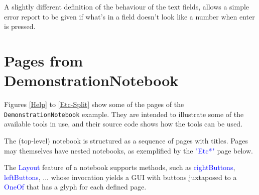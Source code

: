\documentclass[12pt,a4paper]{article}
\def\Scala#1{\textcolor{blue}{\textsf{#1}}}
\def\S#1{\section{#1}}
\begin{document}

A slightly different definition of the behaviour of the text fields, allows
a simple error report to be given if what's in a field doesn't look like
a number when enter is pressed.


\clearpage
\S{Pages from {DemonstrationNotebook}}

Figures \ref{Help} to \ref{Etc-Split} show some of the pages
of the \texttt{DemonstrationNotebook} example. They are intended to
illustrate some of the available tools in use, and their source
code shows how the tools can be used.

The  (top-level) notebook is structured as
a sequence of pages with titles. Pages may themselves
have nested notebooks, as exemplified by the
\Scala{"Etc*"} page below.

The \Scala{Layout} feature of a notebook supports methods, such as
\Scala{rightButtons}, \Scala{leftButtons}, ... whose invocation
yields a GUI with buttons juxtaposed to a \Scala{OneOf} that has
a glyph for each defined page.
\end{document}
